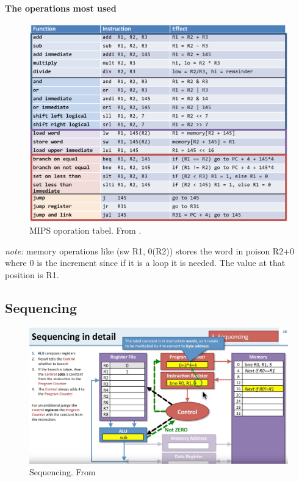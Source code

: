 \noindent\textbf{The operations most used} \newline
\begin{figure}[H]
    \centering
    \includegraphics[width=12cm]{image/mips-tabel.png} 
    \caption{MIPS oporation tabel. From \cite{computer_architecture_book}.}
    \label{mips-tabel}
\end{figure}

\emph{note:} memory operations like (sw R1, 0(R2)) stores the word in poison R2+0 where 0 is the increment
since if it is a loop it is needed. The value at that position is R1. 


\subsection{Sequencing}
\begin{figure}[H]
    \centering
    \includegraphics[width=16cm]{image/sequencing.png} 
    \caption{Sequencing. From \cite{isa_sequencing}}
    \label{sequencing}
\end{figure}

